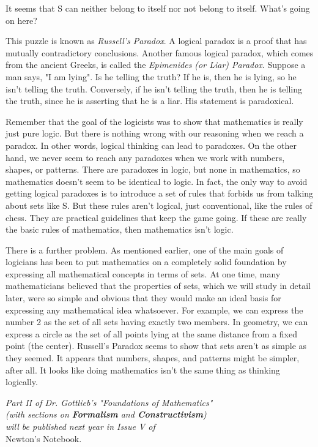 It seems that S can neither belong to itself nor not belong to itself. What's going on here?

     This puzzle is known as \emph{Russell's Paradox}.  A logical paradox is a proof that has mutually contradictory conclusions.  Another famous logical paradox, which comes from the ancient Greeks, is called the \emph{Epimenides (or Liar) Paradox}.  Suppose a man says, "I am lying".  Is he telling the truth?  If he is, then he is lying, so he isn't telling the truth.  Conversely, if he isn't telling the truth, then he is telling the truth, since he is asserting that he is a liar.  His statement is paradoxical.
     
    Remember that the goal of the logicists was to show that mathematics is really just pure logic.  But there is nothing wrong with our reasoning when we reach a paradox.  In other words, logical thinking can lead to paradoxes.  On the other hand, we never seem to reach any paradoxes when we work with numbers, shapes, or patterns.  There are paradoxes in logic, but none in mathematics, so mathematics doesn't seem to be identical to logic.  In fact, the only way to avoid getting logical paradoxes is to introduce a set of rules that forbids us from talking about sets like S.  But these rules aren't logical, just conventional, like the rules of chess.  They are practical guidelines that keep the game going.  If these are really the basic rules of mathematics, then mathematics isn't logic.
    
     There is a further problem.  As mentioned earlier, one of the main goals of  logicians has been to put mathematics on a completely solid foundation by expressing all mathematical concepts in terms of sets. At one time, many mathematicians believed that the properties of sets, which we will study in detail later,  were so simple and obvious that they would make an ideal basis for expressing any mathematical idea whatsoever.  For example, we can express the number 2 as the set of all sets having exactly two members.  In geometry, we can express a circle as the set of all points lying at the same distance from a fixed point (the center). Russell's Paradox seems to show that sets aren't as simple as they seemed.  It appears that numbers, shapes, and patterns might be simpler, after all.  It looks like doing mathematics isn't the same thing as thinking logically.  
\newline\newline\newline\newline\newline
\begin{center}
	\textit{Part II of Dr. Gottlieb's "Foundations of Mathematics"\\ 
	(with sections on \textbf{Formalism} and \textbf{Constructivism})\\
	will be published next year in Issue V of} \\
	Newton's Notebook.
\end{center}